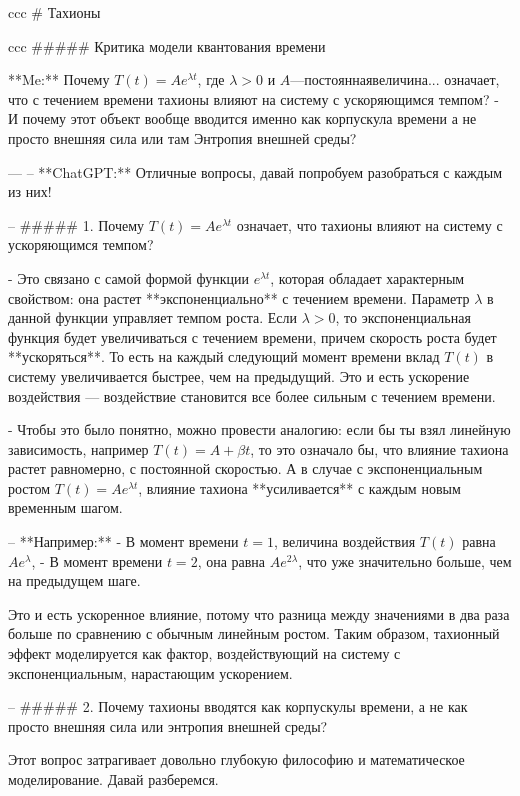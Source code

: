 ccc #  Тахионы
 
 
ccc   ##### Критика модели квантования времени   

**Me:**
Почему \( T(t) = A e^{\lambda t} \), где \(λ>0\)  и \(A — постоянная величина... \) означает, что с течением времени тахионы влияют на систему с ускоряющимся темпом?
-  
И почему этот объект вообще вводится именно как корпускула времени а не просто внешняя сила или там Энтропия внешней среды?

--- 
-- 
**ChatGPT:** 
Отличные вопросы, давай попробуем разобраться с каждым из них!

--  
##### 1. Почему \( T(t) = A e^{\lambda t} \) означает, что тахионы влияют на систему с ускоряющимся темпом?

- 
Это связано с самой формой функции \( e^{\lambda t} \), которая обладает характерным свойством: она растет **экспоненциально** с течением времени. Параметр \( \lambda \) в данной функции управляет темпом роста. Если \( \lambda > 0 \), то экспоненциальная функция будет увеличиваться с течением времени, причем скорость роста будет **ускоряться**. То есть на каждый следующий момент времени вклад \( T(t) \) в систему увеличивается быстрее, чем на предыдущий. Это и есть ускорение воздействия — воздействие становится все более сильным с течением времени.

-  
Чтобы это было понятно, можно провести аналогию: если бы ты взял линейную зависимость, например \( T(t) = A + \beta t \), то это означало бы, что влияние тахиона растет равномерно, с постоянной скоростью. А в случае с экспоненциальным ростом \( T(t) = A e^{\lambda t} \), влияние тахиона **усиливается** с каждым новым временным шагом.

-- 
**Например:**
- В момент времени \( t = 1 \), величина воздействия \( T(t) \) равна \( A e^{\lambda} \),
- В момент времени \( t = 2 \), она равна \( A e^{2\lambda} \), что уже значительно больше, чем на предыдущем шаге.

Это и есть ускоренное влияние, потому что разница между значениями в два раза больше по сравнению с обычным линейным ростом. Таким образом, тахионный эффект моделируется как фактор, воздействующий на систему с экспоненциальным, нарастающим ускорением.

-- 
##### 2. Почему тахионы вводятся как корпускулы времени, а не как просто внешняя сила или энтропия внешней среды?

Этот вопрос затрагивает довольно глубокую философию и математическое моделирование. Давай разберемся.


